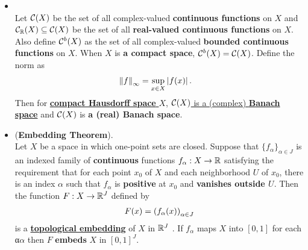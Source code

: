 \documentclass[11pt]{article}
\begin{document}
\begin{itemize}
\item \begin{proposition} \citep{reed1980methods}\\
Let ${\mathcal C}(X)$ be the set of all complex-valued \textbf{continuous functions} on $X$ and ${\mathcal C}_{{\mathbb R}}(X) \subseteq {\mathcal C}(X)$ be the set of all \textbf{real-valued continuous functions} on $X$. Also define ${\mathcal C}^{b}(X)$ as the set of all complex-valued \textbf{bounded continuous functions} on $X$. When $X$ is \textbf{a compact space}, ${\mathcal C}^{b}(X) = {\mathcal C}(X)$.  Define the norm as 
\begin{align*}
\left\|f\right\|_{\infty} &= \sup_{x\in X}\left\lvert f(x) \right\rvert.
\end{align*} Then for \underline{\textbf{compact Hausdorff space} $X$}, \underline{${\mathcal C}(X)$ is a (complex) \textbf{Banach space}} and ${\mathcal C}(X)$ is \textbf{a (real) Banach space}.
\end{proposition}


\item \begin{theorem} (\textbf{Embedding Theorem}).  \citep{munkres2000topology}\\
Let $X$ be a space in which one-point sets are closed. Suppose that $\{f_{\alpha}\}_{\alpha \in J}$ is an indexed family of \textbf{continuous} functions $f_{\alpha}: X \rightarrow {\mathbb R}$ satisfying the requirement that for each point $x_0$ of $X$ and each neighborhood $U$ of $x_0$, there is an index $\alpha$ such that $f_{\alpha}$ is \textbf{positive} at $x_0$ and \textbf{vanishes outside $U$}. Then the function $F : X \rightarrow {\mathbb R}^J$ defined by
\begin{align*}
F(x) = \left(f_{\alpha}(x)\right)_{\alpha \in J}
\end{align*}
is a \underline{\textbf{topological embedding}} of $X$ in ${\mathbb R}^J$ . If $f_{\alpha}$ maps $X$ into $[0, 1]$ for each α$\alpha$  then $F$ \textbf{embeds} $X$ in
$[0, 1]^J$.
\end{theorem}


\end{itemize}
\end{document}
